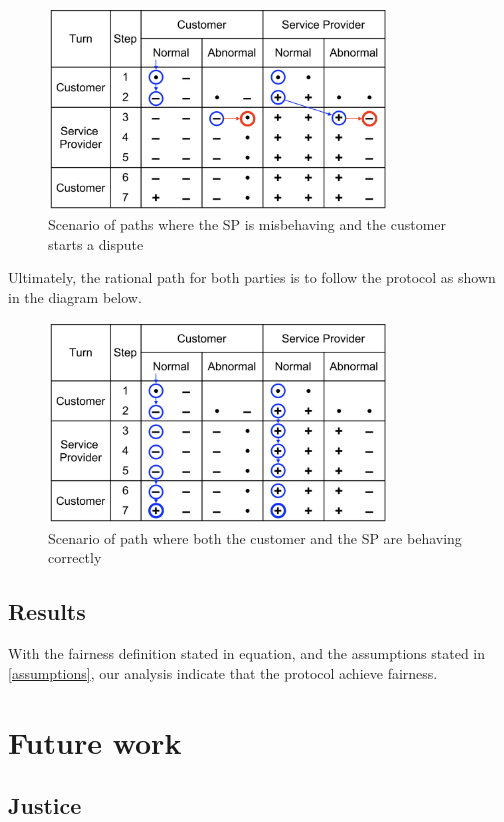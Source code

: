 \documentclass{ieeeaccess}
\begin{document}
\begin{figure}[h!]
\includegraphics[width=9cm]{formal-misbehaviour-path.png}
\centering
\caption{Scenario of paths where the SP is misbehaving and the customer starts a dispute}
\label{fig:misbehaviour}
\end{figure}

Ultimately, the rational path for both parties is to follow the protocol as shown in the diagram below.

\begin{figure}[h!]
\includegraphics[width=9cm]{formal-rational-path.png}
\centering
\caption{Scenario of path where both the customer and  the SP are behaving correctly}
\label{fig:well-behaviour}
\end{figure}

\subsection{Results}\label{results}

With the fairness definition stated in equation, and the assumptions stated in \ref{assumptions}, our analysis indicate that the protocol achieve fairness.



\section{Future work}\label{sec:future-work}
\subsection{Justice}\label{justice}
\end{document}
